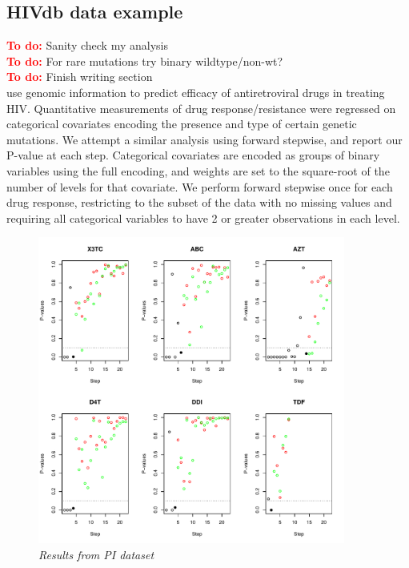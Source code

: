 \documentclass{imsart}
\newcommand{\todo}{\textcolor{red}{\textbf{To do: }}}
\begin{document}
\subsection{HIVdb data example}
\label{sec:hiv}
\todo Sanity check my analysis \\
\todo For rare mutations try binary wildtype/non-wt? \\
\todo Finish writing section \\

\cite{HIV} use genomic information to predict efficacy of antiretroviral
drugs in treating HIV. Quantitative measurements of drug
response/resistance were regressed on categorical covariates encoding
the presence and type of certain genetic mutations. We attempt a similar
analysis using forward stepwise, and report our P-value at each step.
Categorical covariates are encoded as groups of binary variables using
the full encoding, and weights are set to the square-root of the
number of levels for that covariate. We perform forward stepwise once
for each drug response, restricting to the subset of the data with
no missing values and requiring all categorical variables to have 2 or
greater observations in each level. 

\begin{figure}
\begin{center}
\includegraphics[width=0.9\textwidth]{../figs/HIV_PI.pdf}
\caption{\small \it Results from PI dataset}
\label{fig:HIVPI}
\end{center}
\end{figure}
\end{document}

